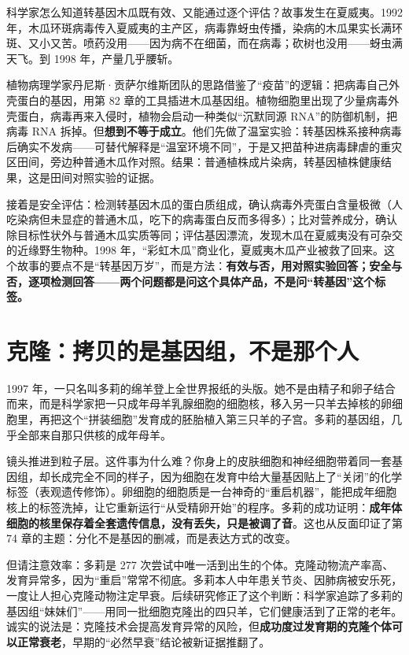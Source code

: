 \begin{zhengju}
科学家怎么知道转基因木瓜既有效、又能通过逐个评估？故事发生在夏威夷。1992 年，木瓜环斑病毒传入夏威夷的主产区，病毒靠蚜虫传播，染病的木瓜果实长满环斑、又小又苦。喷药没用——因为病不在细菌，而在病毒；砍树也没用——蚜虫满天飞。到 1998 年，产量几乎腰斩。

植物病理学家丹尼斯·贡萨尔维斯团队的思路借鉴了“疫苗”的逻辑：把病毒自己外壳蛋白的基因，用第 82 章的工具插进木瓜基因组。植物细胞里出现了少量病毒外壳蛋白，病毒再来入侵时，植物会启动一种类似“沉默同源 RNA”的防御机制，把病毒 RNA 拆掉。但\textbf{想到不等于成立}。他们先做了温室实验：转基因株系接种病毒后确实不发病——可替代解释是“温室环境不同”，于是又把苗种进病毒肆虐的重灾区田间，旁边种普通木瓜作对照。结果：普通植株成片染病，转基因植株健康结果，这是田间对照实验的证据。

接着是安全评估：检测转基因木瓜的蛋白质组成，确认病毒外壳蛋白含量极微（人吃染病但未显症的普通木瓜，吃下的病毒蛋白反而多得多）；比对营养成分，确认除目标性状外与普通木瓜实质等同；评估基因漂流，发现木瓜在夏威夷没有可杂交的近缘野生物种。1998 年，“彩虹木瓜”商业化，夏威夷木瓜产业被救了回来。这个故事的要点不是“转基因万岁”，而是方法：\textbf{有效与否，用对照实验回答；安全与否，逐项检测回答——两个问题都是问这个具体产品，不是问“转基因”这个标签。}
\end{zhengju}

\section{克隆：拷贝的是基因组，不是那个人}

1997 年，一只名叫多莉的绵羊登上全世界报纸的头版。她不是由精子和卵子结合而来，而是科学家把一只成年母羊乳腺细胞的细胞核，移入另一只羊去掉核的卵细胞里，再把这个“拼装细胞”发育成的胚胎植入第三只羊的子宫。多莉的基因组，几乎全部来自那只供核的成年母羊。

镜头推进到粒子层。这件事为什么难？你身上的皮肤细胞和神经细胞带着同一套基因组，却长成完全不同的样子，因为细胞在发育中给大量基因贴上了“关闭”的化学标签（表观遗传修饰）。卵细胞的细胞质是一台神奇的“重启机器”，能把成年细胞核上的标签洗掉，让它重新运行“从受精卵开始”的程序。多莉的成功证明：\textbf{成年体细胞的核里保存着全套遗传信息，没有丢失，只是被调了音}。这也从反面印证了第 74 章的主题：分化不是基因的删减，而是表达方式的改变。

但请注意效率：多莉是 277 次尝试中唯一活到出生的个体。克隆动物流产率高、发育异常多，因为“重启”常常不彻底。多莉本人中年患关节炎、因肺病被安乐死，一度让人担心克隆动物注定早衰。后续研究修正了这个判断：科学家追踪了多莉的基因组“妹妹们”——用同一批细胞克隆出的四只羊，它们健康活到了正常的老年。诚实的说法是：克隆技术会提高发育异常的风险，但\textbf{成功度过发育期的克隆个体可以正常衰老}，早期的“必然早衰”结论被新证据推翻了。


